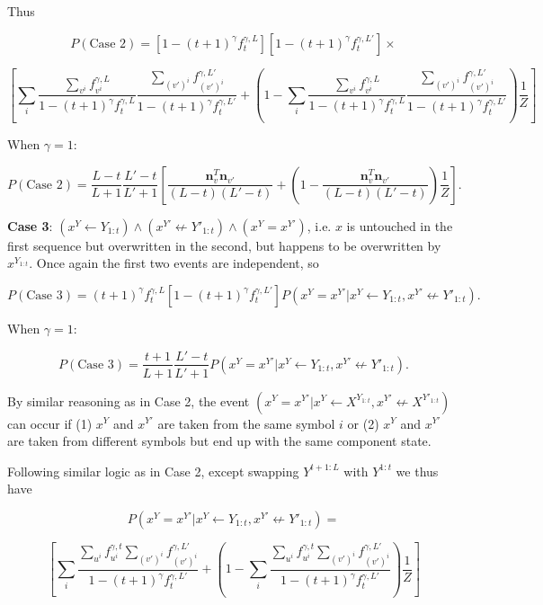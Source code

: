 \documentclass{article}
\begin{document}
\begin{appendices}
Thus

$$P(\textrm{Case 2}) = [1 - (t+1)^\gamma f^{\gamma,L}_t][1 - (t+1)^\gamma f^{\gamma,L'}_t] \times$$

$$\left[
\sum_i \frac{\sum\limits_{v^i} f^{\gamma,L}_{v^i}}{1 - (t+1)^\gamma f^{\gamma,L}_t} \frac{\sum\limits_{(v')^i} f^{\gamma,L'}_{(v')^i}}{1 - (t+1)^\gamma f^{\gamma,L'}_t} + \left(1 - \sum_i \frac{\sum\limits_{v^i} f^{\gamma,L}_{v^i}}{1 - (t+1)^\gamma f^{\gamma,L}_t} \frac{\sum\limits_{(v')^i} f^{\gamma,L'}_{(v')^i}}{1 - (t+1)^\gamma f^{\gamma,L'}_t}\right)\frac{1}{Z}
\right]$$

When $\gamma = 1$:

$$P(\textrm{Case 2}) = \frac{L-t}{L+1}\frac{L'-t}{L'+1}\left[\frac{\mathbf{n}^T_v\mathbf{n}_{v'}}{(L-t)(L'-t)} + \left(1 - \frac{\mathbf{n}^T_v\mathbf{n}_{v'}}{(L-t)(L'-t)} \right)\frac{1}{Z}\right].$$

\textbf{Case 3}: $(x^Y \leftarrow Y_{1:t}) \land (x^{Y'} \not\leftarrow Y'_{1:t}) \land (x^Y = x^{Y'})$, i.e. $x$ is untouched in the first sequence but overwritten in the second, but happens to be overwritten by $x^{Y_{1:t}}$. Once again the first two events are independent, so 

$$P(\textrm{Case 3}) = (t+1)^\gamma f^{\gamma,L}_t[1-(t+1)^\gamma f^{\gamma,L'}_t]P(x^Y = x^{Y'}|x^Y \leftarrow Y_{1:t}, x^{Y'} \not\leftarrow Y'_{1:t}).$$

When $\gamma = 1$:

$$P(\textrm{Case 3}) = \frac{t+1}{L+1}\frac{L'-t}{L'+1}P(x^Y = x^{Y'}|x^Y \leftarrow Y_{1:t}, x^{Y'} \not\leftarrow Y'_{1:t}).$$

By similar reasoning as in Case 2, the event $(x^Y = x^{Y'}|x^Y \leftarrow X^{Y_{1:t}}, x^{Y'} \not\leftarrow X^{Y'_{1:t}})$ can occur if (1) $x^Y$ and $x^{Y'}$ are taken from the same symbol $i$ or (2) $x^Y$ and $x^{Y'}$ are taken from different symbols but end up with the same component state.

Following similar logic as in Case 2, except swapping $Y^{t+1:L}$ with $Y^{1:t}$ we thus have

$$P(x^Y = x^{Y'}|x^Y \leftarrow Y_{1:t}, x^{Y'} \not\leftarrow Y'_{1:t}) =$$

$$\left[
\sum_i \frac{\sum\limits_{u^i} f_{u^i}^{\gamma, t} \sum\limits_{(v')^i} f_{(v')^i}^{\gamma,L'}}{1 - (t+1)^\gamma f^{\gamma,L'}_t} 
+ \left(1 - \sum_i \frac{\sum\limits_{u^i} f_{u^i}^{\gamma, t} \sum\limits_{(v')^i} f_{(v')^i}^{\gamma,L'}}{1 - (t+1)^\gamma f^{\gamma,L'}_t}\right)\frac{1}{Z}
\right]$$


\end{appendices}
\end{document}
